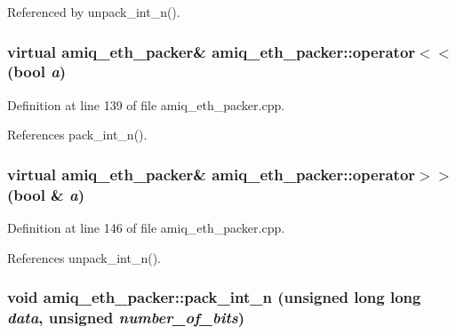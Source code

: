 Referenced by unpack\_\-int\_\-n().\hypertarget{classamiq__eth__packer_adbe11f8c9700a57579712e4ec93f379c}{
\subsubsection[{operator$<$$<$}]{\setlength{\rightskip}{0pt plus 5cm}virtual {\bf amiq\_\-eth\_\-packer}\& amiq\_\-eth\_\-packer::operator$<$$<$ (bool {\em a})}}
\label{classamiq__eth__packer_adbe11f8c9700a57579712e4ec93f379c}


Definition at line 139 of file amiq\_\-eth\_\-packer.cpp.

References pack\_\-int\_\-n().\hypertarget{classamiq__eth__packer_a5ac87df11ad060f344d99c1438ac0d3f}{
\subsubsection[{operator$>$$>$}]{\setlength{\rightskip}{0pt plus 5cm}virtual {\bf amiq\_\-eth\_\-packer}\& amiq\_\-eth\_\-packer::operator$>$$>$ (bool \& {\em a})}}
\label{classamiq__eth__packer_a5ac87df11ad060f344d99c1438ac0d3f}


Definition at line 146 of file amiq\_\-eth\_\-packer.cpp.

References unpack\_\-int\_\-n().\hypertarget{classamiq__eth__packer_a3c0488109ff70104c0daa0ec8b180d15}{
\subsubsection[{pack\_\-int\_\-n}]{\setlength{\rightskip}{0pt plus 5cm}void amiq\_\-eth\_\-packer::pack\_\-int\_\-n (unsigned long long {\em data}, \/  unsigned {\em number\_\-of\_\-bits})}}
\label{classamiq__eth__packer_a3c0488109ff70104c0daa0ec8b180d15}


